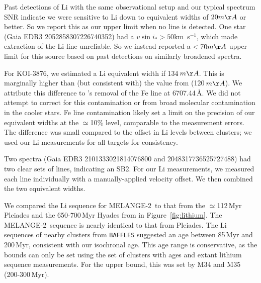 \documentclass[twocolumn]{aastex631}
\newcommand{\starname}{KOI-3876}
\newcommand{\vsini}{$v\sin{i_*}$}
\newcommand\kms{km~s$^{-1}$}
\newcommand{\association}{MELANGE-2}
\begin{document}
Past detections of Li with the same observational setup and our typical spectrum SNR indicate we were sensitive to Li down to equivalent widths of $20m\AA$ or better. So we report this as our upper limit when no line is detected. One star (Gaia EDR3 2052858307226740352) had a \vsini$>50$\kms, which made extraction of the Li line unreliable. So we instead reported a $<70m\AA$ upper limit for this source based on past detections on similarly broadened spectra. 



For \starname, we estimated a Li equivalent width if 134\,$m\AA$. This is marginally higher than (but consistent with) the value from \citet{2018ApJ...855..115B} (120\,$m\AA$). We attribute this difference to \citet{2018ApJ...855..115B}'s removal of the Fe line at 6707.44\,\AA. We did not attempt to correct for this contamination or from broad molecular contamination in the cooler stars. Fe line contamination likely set a limit on the precision of our equivalent widths at the $\simeq$10\% level, comparable to the measurement errors. The difference was small compared to the offset in Li levels between clusters; we used our Li measurements for all targets for consistency.

Two spectra (Gaia EDR3 2101333021814076800 and 2048317736525727488) had two clear sets of lines, indicating an SB2. For our Li measurements, we measured each line individually with a manually-applied velocity offset. We then combined the two equivalent widths. 

We compared the Li sequence for \association\ to that from the $\simeq$112\,Myr Pleiades \citet{2018A&A...613A..63B} and the 650-700\,Myr Hyades from \citep{2017AJ....153..128C} in Figure~\ref{fig:lithium}. The \association\ sequence is nearly identical to that from Pleiades. The Li sequences of nearby clusters from \texttt{BAFFLES} \citep{BAFFLES2020} suggested an age between 85\,Myr and 200\,Myr, consistent with our isochronal age. This age range is conservative, as the bounds can only be set using the set of clusters with ages and extant lithium sequence measurements. For the upper bound, this was set by M34 and M35 (200-300\,Myr).
\end{document}
